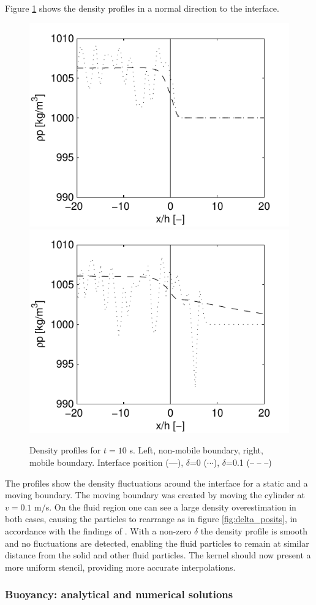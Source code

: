 Figure \ref{fig:delta_dens} shows the density profiles in a normal direction to the interface.
%
\begin{figure}[ht!]
	\centering
	\includegraphics[width=0.45\linewidth]{Figures/5.Chapter/fig2a} 
	\includegraphics[width=0.45\linewidth]{Figures/5.Chapter/fig3a}
	\caption{Density profiles for $t=10$ s. Left, non-mobile boundary, right, mobile boundary. Interface position (---), $\delta$=0 ($\cdots$), $\delta$=0.1 (-- -- --)}
	\label{fig:delta_dens} 
\end{figure}
%
The profiles show the density fluctuations around the interface for a static and a moving boundary. The moving boundary was created by moving the cylinder at $v=0.1$ m/s. On the fluid region one can see a large density overestimation in both cases, causing the particles to rearrange as in figure \ref{fig:delta_posits}, in accordance with the findings of \cite{Saitoh-2013}. With a non-zero $\delta$ the density profile is smooth and no fluctuations are detected, enabling the fluid particles to remain at similar distance from the solid and other fluid particles. The kernel should now present a more uniform stencil, providing more accurate interpolations.

\subsubsection{Buoyancy: analytical and numerical solutions}
\label{subsec:boyant_analytical}

